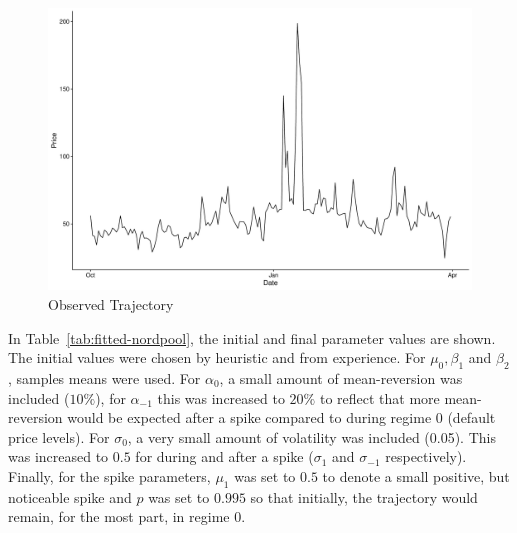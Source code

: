 \begin{figure}[H]
        \centering
        \includegraphics[width=12cm]{images/fitting/full_model/obs_traj.pdf}
        \caption{Observed Trajectory}
        \label{fig:obs-traj}
\end{figure}

In Table~\ref{tab:fitted-nordpool}, the initial and final parameter values are shown. The initial values were chosen by heuristic and from experience. For $\mu_0, \beta_1$ and $\beta_2$, samples means were used. For $\alpha_0$, a small amount of mean-reversion was included ($10\%$), for $\alpha_{-1}$ this was increased to $20\%$ to reflect that more mean-reversion would be expected after a spike compared to during regime $0$ (default price levels). For $\sigma_0$, a very small amount of volatility was included (0.05). This was increased to $0.5$ for during and after a spike ($\sigma_1$ and $\sigma_{-1}$ respectively). Finally, for the spike parameters, $\mu_1$ was set to $0.5$ to denote a small positive, but noticeable spike and $p$ was set to $0.995$ so that initially, the trajectory would remain, for the most part, in regime $0$.

